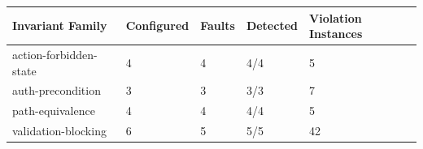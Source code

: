 \begin{tabular}{lllll}
\toprule
Invariant Family & Configured & Faults & Detected & Violation Instances \\
\midrule
action-forbidden-state & 4 & 4 & 4/4 & 5 \\
auth-precondition & 3 & 3 & 3/3 & 7 \\
path-equivalence & 4 & 4 & 4/4 & 5 \\
validation-blocking & 6 & 5 & 5/5 & 42 \\
\bottomrule
\end{tabular}
